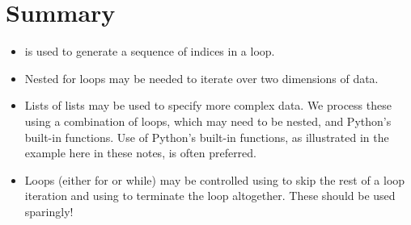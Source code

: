 \documentclass[letterpaper,10pt,english]{sphinxmanual}
\begin{document}
\section{Summary}
\label{\detokenize{lecture_notes/lec12_loops2_for_double:summary}}\begin{itemize}
\item {} 
 is used to generate a sequence of indices in a 
loop.

\item {} 
Nested for loops may be needed to iterate over two dimensions of
data.

\item {} 
Lists of lists may be used to specify more complex data.  We process
these using a combination of  loops, which may need to be
nested, and Python’s built-in functions.  Use of Python’s built-in
functions, as illustrated in the example here in these notes, is
often preferred.

\item {} 
Loops (either for or while) may be controlled using  to
skip the rest of a loop iteration and using  to terminate
the loop altogether.  These should be used sparingly!

\end{itemize}
\end{document}
